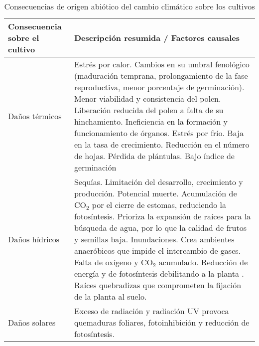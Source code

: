 \begin{table}[ht]
	\centering
	\caption{Consecuencias de origen abiótico del cambio climático sobre los cultivos}
	\begin{tabularx}{\textwidth}{|l|X|}
		\hline
		\textbf{Consecuencia sobre el cultivo} & \textbf{Descripción resumida / Factores causales} \\ \hline
		Daños térmicos & Estrés por calor. \linebreak%
		 Cambios en su umbral fenológico (maduración temprana, prolongamiento de la fase reproductiva, menor porcentaje de germinación).\linebreak%
		 Menor viabilidad y consistencia del polen.\linebreak%
		 Liberación reducida del polen a falta de su hinchamiento.\linebreak%
		 Ineficiencia en la formación y funcionamiento de órganos.\linebreak%
		 Estrés por frío. \linebreak%
		 Baja en la tasa de crecimiento.\linebreak%
		 Reducción en el número de hojas.\linebreak%
		 Pérdida de plántulas.\linebreak%
		 Bajo índice de germinación\linebreak%
		 \\ \hline
		Daños hídricos & Sequías.\linebreak%
		Limitación del desarrollo, crecimiento y producción.\linebreak%
		Potencial muerte.\linebreak%
		Acumulación de CO$_2$ por el cierre de estomas, reduciendo la fotosíntesis.\linebreak%
		Prioriza la expansión de raíces para la búsqueda de agua, por lo que la calidad de frutos y semillas baja.\linebreak%
		Inundaciones.\linebreak%
		Crea ambientes anaeróbicos que impide el intercambio de gases. \linebreak%
		Falta de oxígeno y CO$_2$ acumulado.\linebreak%
		Reducción de energía y de fotosíntesis debilitando a la planta .\linebreak%
		Raíces quebradizas que comprometen la fijación de la planta al suelo.\linebreak%
		\\ \hline
		Daños solares & Exceso de radiación y radiación UV provoca quemaduras foliares, fotoinhibición y reducción de fotosíntesis. \\ \hline

\end{tabularx}
\end{table}
